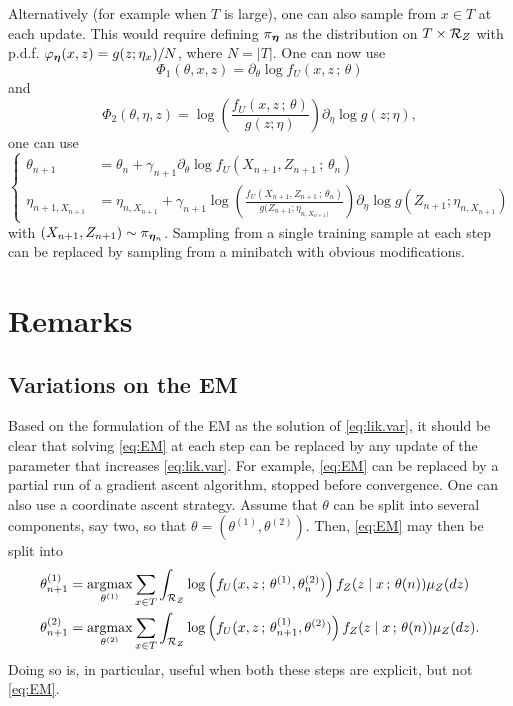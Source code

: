 Alternatively (for example when $T$ is large), one can also sample from $x\in T$ at each update. This would require defining $\pi_{{\bm{\eta}}}$ as the distribution on $T\times {\mathcal R}_Z$ with p.d.f. $\varphi_{{\bm{\eta}}}(x, z) = g(z;\eta_x) / N$, where $N=|T|$. One can now use
\[
\Phi_1(\theta, x, z) =  \partial_\theta \log f_U(x, z\,;\,\theta)
\]
and
\[
\Phi_2(\theta, \eta, z) = \log \left(\frac{f_U(x,
z\,;\,\theta)}{g(z;\eta)}\right)\partial_\eta \log g(z;\eta),
\]
one can use 
\begin{equation}
\label{eq:sga.var.2}
\left\{
\begin{aligned}
\theta_{n+1} &= \theta_n + \gamma_{n+1} \partial_\theta \log f_U(X_{n+1}, Z_{n+1}\,;\,\theta_n)\\
\eta_{n+1,X_{n+1}} &= \eta_{n,X_{n+1}} + \gamma_{n+1} \log \left(\frac{f_U(X_{n+1},
Z_{n+1}\,;\,\theta_n)}{g(Z_{n+1};\eta_{n, X_{n+1})}}\right)\partial_\eta \log g(Z_{n+1};\eta_{n, X_{n+1}})
\end{aligned}
\right.
\end{equation}
with $(X_{n+1}, Z_{n+1}) \sim \pi_{{\bm{\eta}}_{n}}$. Sampling from a single training sample at each step can be replaced by sampling from a minibatch with obvious modifications.

\section{Remarks}
\subsection{Variations on the EM}
Based on the formulation of the EM as the solution of \cref{eq:lik.var}, it should be clear  that solving \cref{eq:EM} at each step can be replaced by any update of the parameter that increases \cref{eq:lik.var}.
For example, \cref{eq:EM} can be replaced by a partial run of a gradient ascent algorithm, stopped before convergence. One can also use a coordinate ascent strategy. Assume that $\theta$ can be split into several components, say two, so that $\theta = (\theta^{(1)}, \theta^{(2)})$. Then, \cref{eq:EM} may then be split into 
\begin{align*}
\theta^{(1)}_{n+1} & = \operatorname*{argmax}_{\theta^{(1)}} \sum_{x\in T} \int_{{\mathcal R}_Z} \log \left(f_U(x,
z\,;\,\theta^{(1)}, \theta^{(2)}_{n})\right) f_Z(z\mid x\,;\,\theta(n)) \mu_Z(dz)\\
\theta^{(2)}_{n+1} & = \operatorname*{argmax}_{\theta^{(2)}} \sum_{x\in T} \int_{{\mathcal R}_Z} \log \left(f_U(x,
z\,;\,\theta^{(1)}_{n+1}, \theta^{(2)})\right) f_Z(z\mid x\,;\,\theta(n)) \mu_Z(dz).
\end{align*}
Doing so is, in particular, useful when both these steps are explicit, but not \cref{eq:EM}.
 
